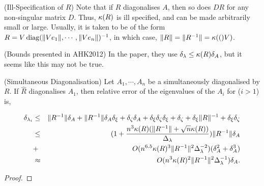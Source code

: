 \begin{remark} (Ill-Specification of $R$)
  Note that if $R$ diagonalises $A$, then so does $DR$ for any non-singular matrix $D$. Thus, $\kappa(R)$ is ill specified, and can be made arbitrarily small or large. Usually, it is taken to be of the form $R = V\operatorname{diag}(\|V e_1\|, \cdots, \|V e_n\|)^{-1}$, in which case, $\|R\| = \|R^{-1}\| = \kappa(()V)$.
\end{remark}

\begin{remark} (Bounds presented in AHK2012)
    In the paper, they use $\delta_{\lambda} \le \kappa(R)\delta_A$, but
    it seems like this may not be true.
\end{remark}

\begin{proposition}(Simultaneous Diagonalisation)
  \label{prop:sim-eigd}
  Let $A_1, \cdots, A_n$ be a simultaneously diagonalised by $R$. If $\hat{R}$ diagonalises $A_1$, then relative
    error of the eigenvalues of the $A_i$ for ($i > 1$) is,

    \begin{eqnarray}
    \delta_{\lambda_i} 
      &\le& \|R^{-1}\| \delta_{A} + \|R^{-1}\| \delta_{A} \delta_{\xi}
            + \delta_{\zeta} \delta_{A} + \delta_{\xi} \delta_{\zeta} \delta_{\xi}
            + \delta_{\zeta} + \delta_{\xi} \|R\|^{-1} + \delta_{\xi} \delta_{\zeta} \\
      &\le& (1 + \frac{ n^3 \kappa(R) (\|R^{-1}\| + \sqrt{n} \kappa(R))}{\Delta_{\lambda}} ) \|R^{-1}\| \delta_{A} \\ 
      &+& O(n^{6.5} \kappa(R)^3 \|R^{-1}\|^2 \Delta_{\lambda}^{-2}) (\delta_{A}^2 + \delta_{A}^3) \\
    &\approx& O(n^3 \kappa(R)^2 \|R^{-1}\|^2 \Delta_{\lambda}^{-1}) \delta_{A}.
    \end{eqnarray}
\end{proposition}

\begin{proof}
\end{proof}

